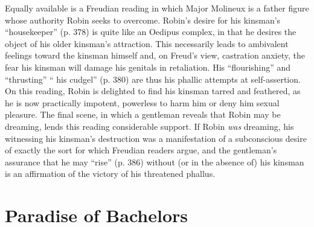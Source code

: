 \documentclass[man,12pt,natbib]{apa6}
\begin{document}
Equally available is a Freudian reading in which Major Molineux is a father
figure whose authority Robin seeks to overcome. Robin's desire for his
kinsman's ``housekeeper'' (p. 378) is quite like an Oedipus complex, in that he
desires the object of his older kinsman's attraction. This necessarily leads to
ambivalent feelings toward the kinsman himself and, on Freud's view, castration
anxiety, the fear his kinsman will damage his genitals in retaliation. His
``flourishing'' and ``thrusting'' `` his cudgel'' (p. 380) are thus his phallic
attempts at self-assertion. On this reading, Robin is delighted to find his
kinsman tarred and feathered, as he is now practically impotent, powerless to
harm him or deny him sexual pleasure. The final scene, in which a gentleman
reveals that Robin may be dreaming, lends this reading considerable support. If
Robin \emph{was} dreaming, his witnessing his kinsman's destruction was a
manifestation of a subconscious desire of exactly the sort for which Freudian
readers argue, and the gentleman's assurance that he may ``rise'' (p. 386)
without (or in the absence of) his kinsman is an affirmation of the victory of
his threatened phallus.

\section{Paradise of Bachelors}
\nocite{Melville12}
\end{document}
